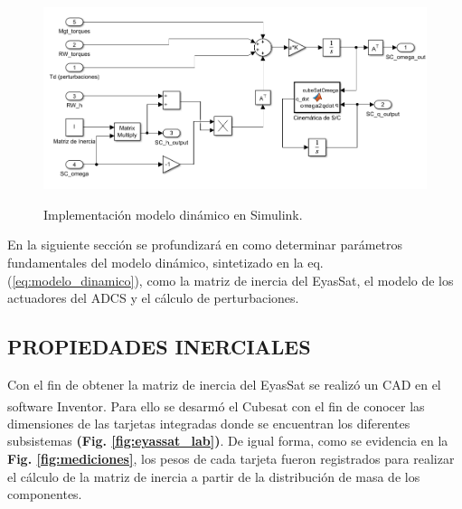 \begin{figure}[!h]
	\begin{center}
		\includegraphics[scale=0.6]{imagenes/modelo_dinamico/dinamica_satelite.PNG}\\
	\end{center}
	\caption{Implementación modelo dinámico en Simulink.}
	\label{fig:din_sc}
	\textit{}
\end{figure}

En la siguiente sección se profundizará en como determinar parámetros fundamentales del modelo dinámico, sintetizado en la eq. (\ref{eq:modelo_dinamico}), como la matriz de inercia del EyasSat, el modelo de los actuadores del ADCS y el cálculo de perturbaciones. 

\newpage
\subsection{PROPIEDADES INERCIALES}


Con el fin de obtener la matriz de inercia del EyasSat se realizó un CAD en el software Inventor\textsuperscript{\tiny\textregistered}. Para ello se desarmó el Cubesat con el fin de conocer las dimensiones de las tarjetas integradas donde se encuentran los diferentes subsistemas \textbf{(Fig. \ref{fig:eyassat_lab})}. De igual forma, como se evidencia en la \textbf{Fig. \ref{fig:mediciones}}, los pesos de cada tarjeta fueron registrados para realizar el cálculo de la matriz de inercia a partir de la distribución de masa de los componentes.


